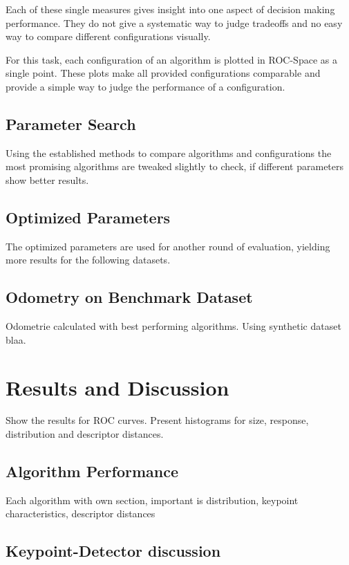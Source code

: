 Each of these single measures gives insight into one aspect of decision making performance.
They do not give a systematic way to judge tradeoffs and no easy way to compare different configurations visually.

For this task, each configuration of an algorithm is plotted in \gls{ROC}-Space as a single point.
These plots make all provided configurations comparable and provide a simple way to judge the performance of a configuration.

\subsection{Parameter Search}

Using the established methods to compare algorithms and configurations the most promising algorithms are tweaked slightly to check, if different parameters show better results.

\subsection{Optimized Parameters}

The optimized parameters are used for another round of evaluation, yielding more results for the following datasets.

\subsection{Odometry on Benchmark Dataset}

Odometrie calculated with best performing algorithms.
Using synthetic dataset blaa.

\section{Results and Discussion}

Show the results for ROC curves.
Present histograms for size, response, distribution and descriptor distances.

\subsection{Algorithm Performance}

Each algorithm with own section, important is distribution, keypoint characteristics, descriptor distances

\subsection{Keypoint-Detector discussion}

